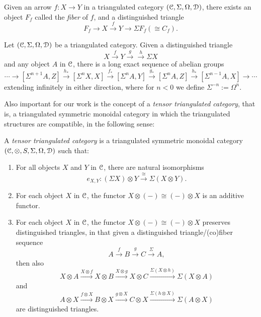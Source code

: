\documentclass[../main.tex]{subfiles}
\begin{document}
\begin{proposition}\label{fiber}
    Given an arrow $f:X\to Y$ in a triangulated category $(\mathcal C,\Sigma,\Omega,\mathcal D)$, there exists an object $F_f$ called the \emph{fiber} of $f$, and a distinguished triangle
    \[F_f\to X\xrightarrow fY\to\Sigma F_f(\cong C_f).\]
\end{proposition}

\begin{proposition}\label{dist_tri_LES}
    Let $(\mathcal C,\Sigma,\Omega,\mathcal D)$ be a triangulated category. Given a distinguished triangle
    \[X\xrightarrow fY\xrightarrow g\xrightarrow h\Sigma X\]
    and any object $A$ in $\mathcal C$, there is a long exact sequence of abelian groups
    \[\cdots\to[\Sigma^{n+1}A,Z]\xrightarrow{h_*}[\Sigma^nX,X]\xrightarrow{f_*}[\Sigma^nA,Y]\xrightarrow{g_*}[\Sigma^nA,Z]\xrightarrow{h_*}[\Sigma^{n-1}A,X]\to\cdots\]
    extending infinitely in either direction, where for $n<0$ we define $\Sigma^{-n}:=\Omega^n$.
\end{proposition}

Also important for our work is the concept of a \emph{tensor triangulated category}, that is, a triangulated symmetric monoidal category in which the triangulated structures are compatible, in the following sense:

\begin{definition}\label{tentri}
    A \textit{tensor triangulated category} is a triangulated symmetric monoidal category $(\mathcal C,\otimes,S,\Sigma,\Omega,\mathcal D)$ such that:\begin{enumerate}[label=\textbf{TT\arabic*}]
        \item For all objects $X$ and $Y$ in $\mathcal C$, there are natural isomorphisms
        \[e_{X,Y}:(\Sigma X)\otimes Y\xrightarrow\cong\Sigma(X\otimes Y).\]
        \item For each object $X$ in $\mathcal C$, the functor $X\otimes(-)\cong(-)\otimes X$ is an additive functor.
        \item For each object $X$ in $\mathcal C$, the functor $X\otimes(-)\cong(-)\otimes X$ preserves distinguished triangles, in that given a distinguished triangle/(co)fiber sequence
        \[A\xrightarrow fB\xrightarrow gC\xrightarrow\Sigma A,\]
        then also
        \[X\otimes A\xrightarrow{X\otimes f}X\otimes B\xrightarrow{X\otimes g}X\otimes C\xrightarrow{\Sigma(X\otimes h)}\Sigma(X\otimes A)\]
        and
        \[A\otimes X\xrightarrow{f\otimes X}B\otimes X\xrightarrow{g\otimes X}C\otimes X\xrightarrow{\Sigma(h\otimes X)}\Sigma(A\otimes X)\]
        are distinguished triangles.
    \end{enumerate}
\end{definition}
\end{document}
